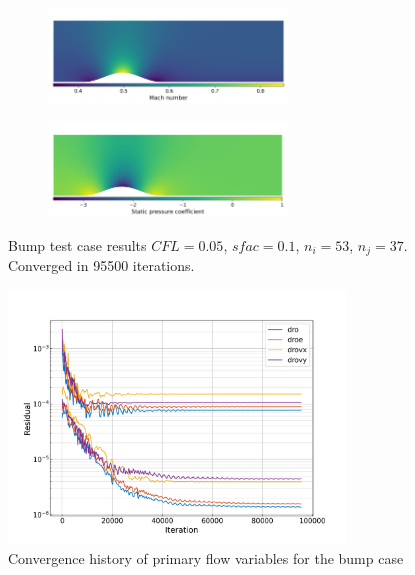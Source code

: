 \documentclass{article}
\begin{document}
\begin{figure}[H]
    \centering
    \begin{subfigure}{0.99\textwidth}
        \centering
        \includegraphics[width=0.7\textwidth]{figures/bump_mach.png}
        \caption{}
        \label{fig:bump_mach}
    \end{subfigure}
    \begin{subfigure}{0.99\textwidth}
        \centering
        \includegraphics[width=0.7\textwidth]{figures/bump_cp.png}
        \caption{}
        \label{fig:bump_cp}
    \end{subfigure}
    \caption{Bump test case results $CFL = 0.05$, $sfac = 0.1$, $n_i = 53$, $n_j = 37$. Converged in 95500 iterations.}
\end{figure}

\begin{figure}[H]
    \centering
    \includegraphics[width=0.8\textwidth]{figures/bump_conv.png}
    \caption{Convergence history of primary flow variables for the bump case}
    \label{fig:bump_conv}
\end{figure}
\end{document}

